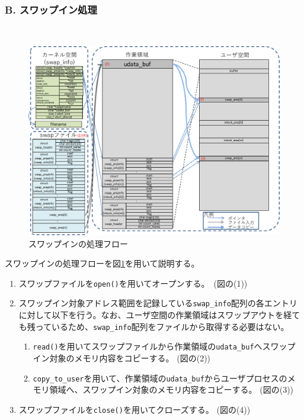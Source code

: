 \documentclass[twoside,11pt,fleqn]{book}
\begin{document}
\subsubsection*{B. スワップイン処理}{\quad}\\
%
\begin{figure}[!h]
\centering
\includegraphics[width=0.90\linewidth]{figs/pagein.pdf}
\vspace{-0em}\caption{スワップインの処理フロー}
\label{fig:pagein}
\vspace{-0em}
\end{figure}
\FloatBarrier
%
スワップインの処理フローを図\ref{fig:pagein}を用いて説明する。
\begin{enumerate}
\item スワップファイルを\texttt{open()}を用いてオープンする。　(図の(1))
\item スワップイン対象アドレス範囲を記録している\texttt{swap\_info}配列の各エントリに対して以下を行う。なお、ユーザ空間の作業領域はスワップアウトを経ても残っているため、\texttt{swap\_info}配列をファイルから取得する必要はない。
\begin{enumerate}
\item \texttt{read()}を用いてスワップファイルから作業領域の\texttt{udata\_buf}へスワップイン対象のメモリ内容をコピーする。 (図の(2))
\item \texttt{copy\_to\_user}を用いて、作業領域の\texttt{udata\_buf}からユーザプロセスのメモリ領域へ、スワップイン対象のメモリ内容をコピーする。 (図の(3))
\end{enumerate}
\item スワップファイルを\texttt{close()}を用いてクローズする。 (図の(4))
\end{enumerate}
\FloatBarrier
\end{document}
